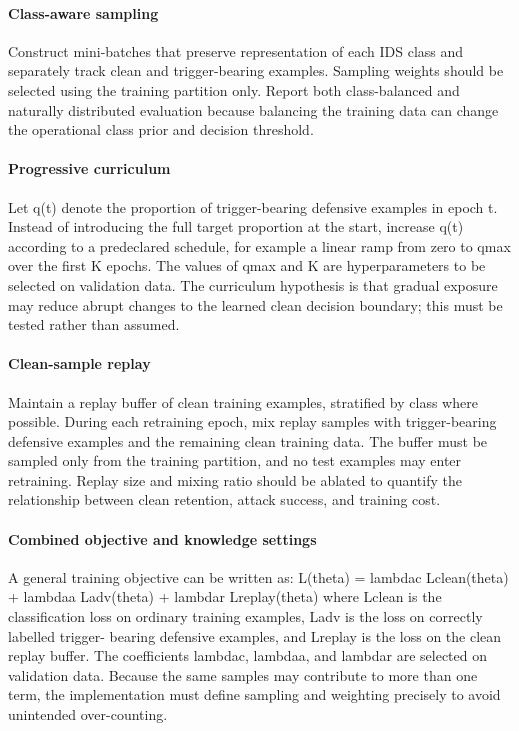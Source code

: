 \documentclass[11pt]{article}
\begin{document}
\paragraph{Class-aware sampling}
Construct mini-batches that preserve representation of each IDS class and separately track clean and trigger-bearing examples. Sampling weights should be selected using the training partition only. Report both class-balanced and naturally distributed evaluation because balancing the training data can change the operational class prior and decision threshold.

\paragraph{Progressive curriculum}
Let q(t) denote the proportion of trigger-bearing defensive examples in epoch t. Instead of introducing the full target proportion at the start, increase q(t) according to a predeclared schedule, for example a linear ramp from zero to qmax over the first K epochs. The values of qmax and K are hyperparameters to be selected on validation data. The curriculum hypothesis is that gradual exposure may reduce abrupt changes to the learned clean decision boundary; this must be tested rather than assumed.

\paragraph{Clean-sample replay}
Maintain a replay buffer of clean training examples, stratified by class where possible. During each retraining epoch, mix replay samples with trigger-bearing defensive examples and the remaining clean training data. The buffer must be sampled only from the training partition, and no test examples may enter retraining. Replay size and mixing ratio should be ablated to quantify the relationship between clean retention, attack success, and training cost.

\paragraph{Combined objective and knowledge settings}
A general training objective can be written as: L(theta) = lambdac Lclean(theta) + lambdaa Ladv(theta) + lambdar Lreplay(theta) where Lclean is the classification loss on ordinary training examples, Ladv is the loss on correctly labelled trigger- bearing defensive examples, and Lreplay is the loss on the clean replay buffer. The coefficients lambdac, lambdaa, and lambdar are selected on validation data. Because the same samples may contribute to more than one term, the implementation must define sampling and weighting precisely to avoid unintended over-counting.
\end{document}
